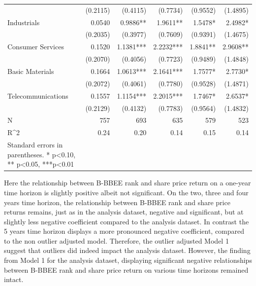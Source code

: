\begin{table}[H]
{\begin{tabular}{lrrrrr}
                   & (0.2115)  & (0.4115)  & (0.7734)  & (0.9552)  & (1.4895)  \\
Industrials        & 0.0540    & 0.9886**  & 1.9611**  & 1.5478*   & 2.4982*   \\
                   & (0.2035)  & (0.3977)  & (0.7609)  & (0.9391)  & (1.4675)  \\
Consumer Services  & 0.1520    & 1.1381*** & 2.2232*** & 1.8841**  & 2.9608**  \\
                   & (0.2070)  & (0.4056)  & (0.7723)  & (0.9489)  & (1.4848)  \\
Basic Materials    & 0.1664    & 1.0613*** & 2.1641*** & 1.7577*   & 2.7730*   \\
                   & (0.2072)  & (0.4061)  & (0.7780)  & (0.9528)  & (1.4871)  \\
Telecommunications & 0.1557    & 1.1154*** & 2.2015*** & 1.7467*   & 2.6537*   \\
                   & (0.2129)  & (0.4132)  & (0.7783)  & (0.9564)  & (1.4832)  \\
N                  & 757       & 693       & 635       & 579       & 523       \\
R^2                 & 0.24      & 0.20      & 0.14      & 0.15      & 0.14      \\
   \bottomrule
Standard errors in parentheses.
* p<0.10, ** p<0.05, ***p<0.01
\end{tabular}}
\end{table} 
Here the relationship between B-BBEE rank and share price return on a one-year time horizon is slightly positive albeit not significant. On the two, three and four years time horizon, the relationship between B-BBEE rank and share price returns remains, just as in the analysis dataset,  negative and significant, but at slightly less negative coefficient compared to the analysis dataset. In contrast the 5 years time horizon displays a more pronounced negative coefficient, compared to the non outlier adjusted model. Therefore, the outlier adjusted Model 1 suggest that outliers did indeed impact the analysis dataset. However, the finding from Model 1 for the analysis dataset, displaying significant negative relationships between B-BBEE rank and share price return on various time horizons remained intact.

